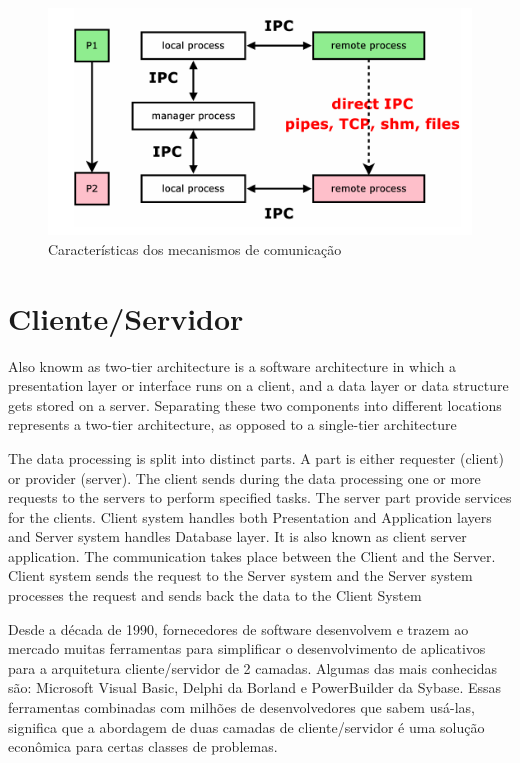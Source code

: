 \begin{figure}[ht]
\centering
\includegraphics[width=1\textwidth]{figuras/ipc.png}
\caption{Características dos mecanismos de comunicação}
\label{fig:how-communication-works}
\end{figure}

\section{Cliente/Servidor}\label{sec:clientserver}

Also knowm as two-tier architecture is a software architecture in which a presentation layer or interface runs on a client, and a data layer or data structure gets stored on a server. Separating these two components into different locations represents a two-tier architecture, as opposed to a single-tier architecture

The data processing is split into distinct parts. A part is either requester (client) or provider (server). The client sends during the data processing one or more requests to the servers to perform specified tasks. The server part provide services for the clients. Client system handles both Presentation and Application layers and Server system handles Database layer. It is also known as client server application. The communication takes place between the Client and the Server. Client system sends the request to the Server system and the Server system processes the request and sends back the data to the Client System


Desde a década de 1990, fornecedores de software desenvolvem e trazem ao mercado muitas ferramentas para simplificar o desenvolvimento de aplicativos para a arquitetura cliente/servidor de 2 camadas. Algumas das mais conhecidas são: Microsoft Visual Basic, Delphi da Borland e PowerBuilder da Sybase. Essas ferramentas combinadas com milhões de desenvolvedores que sabem usá-las, significa que a abordagem de duas camadas de cliente/servidor é uma solução econômica para certas classes de problemas.

